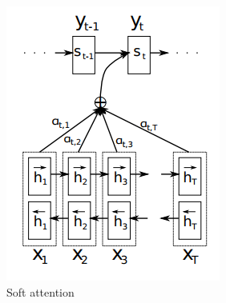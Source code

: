 \documentclass[14pt]{extreport}
\begin{document}
\begin{figure}
    \centering
    \includegraphics{image/bahaunau.PNG}
    \caption{Soft attention}
    \label{fig:bahaunau_att}
\end{figure}
\end{document}

